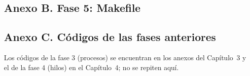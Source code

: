

\subsection*{Anexo B. Fase 5: Makefile}


\subsection*{Anexo C. Códigos de las fases anteriores}
Los códigos de la fase 3 (procesos) se encuentran en los anexos del Capítulo~3 y el de la fase 4 (hilos) en el Capítulo~4; no se repiten aquí.
